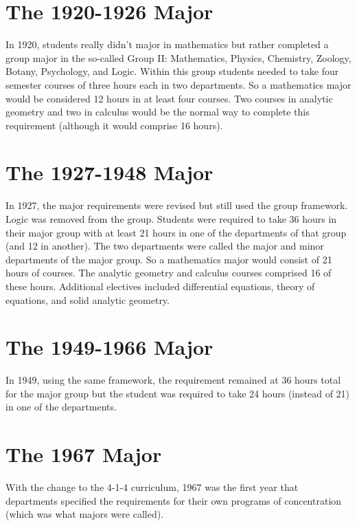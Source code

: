 \documentclass[
]{book}
\begin{document}
\hypertarget{the-1920-1926-major}{%
\section{The 1920-1926 Major}\label{the-1920-1926-major}}

In 1920, students really didn't major in mathematics but rather completed a group major in the so-called Group II: Mathematics, Physics, Chemistry, Zoology, Botany, Psychology, and Logic. Within this group students needed to take four semester courses of three hours each in two departments. So a mathematics major would be considered 12 hours in at least four courses. Two courses in analytic geometry and two in calculus would be the normal way to complete this requirement (although it would comprise 16 hours).

\hypertarget{the-1927-1948-major}{%
\section{The 1927-1948 Major}\label{the-1927-1948-major}}

In 1927, the major requirements were revised but still used the group framework. Logic was removed from the group. Students were required to take 36 hours in their major group with at least 21 hours in one of the departments of that group (and 12 in another). The two departments were called the major and minor departments of the major group. So a mathematics major would consist of 21 hours of courses. The analytic geometry and calculus courses comprised 16 of these hours. Additional electives included differential equations, theory of equations, and solid analytic geometry.

\hypertarget{the-1949-1966-major}{%
\section{The 1949-1966 Major}\label{the-1949-1966-major}}

In 1949, using the same framework, the requirement remained at 36 hours total for the major group but the student was required to take 24 hours (instead of 21) in one of the departments.

\hypertarget{the-1967-major}{%
\section{The 1967 Major}\label{the-1967-major}}

With the change to the 4-1-4 curriculum, 1967 was the first year that departments specified the requirements for their own programs of concentration (which was what majors were called).
\end{document}
